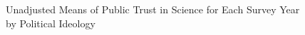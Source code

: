 \documentclass[12pt, a4paper]{report}
\begin{document}


\begin{figure}[h]
	\caption{Unadjusted Means of Public Trust in Science for Each Survey Year by Political Ideology}
	
\end{figure}
\end{document}
